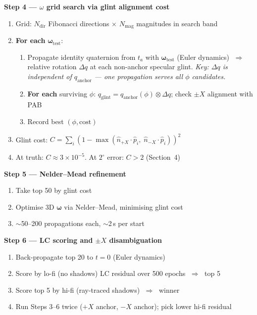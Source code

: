\documentclass[11pt,a4paper]{article}
\begin{document}
\vspace{0.5em}
\noindent\textbf{Step 4 --- $\omega$ grid search via glint alignment cost}
\begin{enumerate}[nosep,label=\alph*.]
  \item Grid: $N_\text{dir}$ Fibonacci directions $\times$ $N_\text{mag}$ magnitudes in search band
  \item \textbf{For each} $\boldsymbol{\omega}_\text{test}$:
  \begin{enumerate}[nosep,label=\roman*.]
    \item Propagate identity quaternion from $t_a$ with $\boldsymbol{\omega}_\text{test}$
      (Euler dynamics) $\;\Rightarrow\;$ relative rotation $\Delta q$ at each non-anchor specular glint.
      \emph{Key: $\Delta q$ is independent of $q_\text{anchor}$ --- one propagation serves all $\phi$ candidates.}
    \item \textbf{For each} surviving $\phi$:
      $q_\text{glint} = q_\text{anchor}(\phi) \otimes \Delta q$;
      check $\pm X$ alignment with PAB
    \item Record best $(\phi, \text{cost})$
  \end{enumerate}
  \item Glint cost: $C = \sum_{i} (1 - \max(\hat{n}_{+X}\!\cdot\hat{p}_i,\;\hat{n}_{-X}\!\cdot\hat{p}_i))^2$
  \item At truth: $C \approx 3 \times 10^{-5}$. \;At $2^\circ$ error: $C > 2$ (Section~4)
\end{enumerate}

\vspace{0.5em}
\noindent\textbf{Step 5 --- Nelder--Mead refinement}
\begin{enumerate}[nosep,label=\alph*.]
  \item Take top 50 by glint cost
  \item Optimise 3D $\boldsymbol{\omega}$ via Nelder--Mead, minimising glint cost
  \item $\sim$50--200 propagations each, $\sim$2\,s per start
\end{enumerate}

\vspace{0.5em}
\noindent\textbf{Step 6 --- LC scoring and $\pm X$ disambiguation}
\begin{enumerate}[nosep,label=\alph*.]
  \item Back-propagate top 20 to $t = 0$ (Euler dynamics)
  \item Score by lo-fi (no shadows) LC residual over 500 epochs $\;\Rightarrow\;$ top 5
  \item Score top 5 by hi-fi (ray-traced shadows) $\;\Rightarrow\;$ winner
  \item Run Steps 3--6 twice ($+X$ anchor, $-X$ anchor); pick lower hi-fi residual
\end{enumerate}
\end{document}
